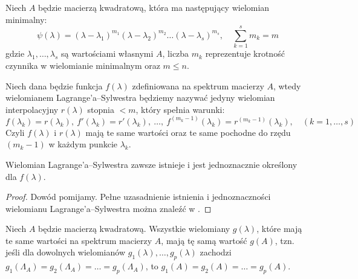 \begin{definition}
    Niech $A$ będzie macierzą kwadratową, która ma następujący wielomian minimalny:
    $$ \psi(\lambda) = (\lambda - \lambda_1)^{m_1}(\lambda - \lambda_2)^{m_2}\ldots(\lambda - \lambda_s)^{m_s}, \quad \sum_{k=1}^{s}{m_k} = m$$
    gdzie $\lambda_1, \ldots, \lambda_s$ są wartościami własnymi $A$, liczba $m_k$ reprezentuje krotność czynnika w wielomianie minimalnym oraz $m \le n$.

    Niech dana będzie funkcja $f(\lambda)$ zdefiniowana na spektrum macierzy $A$, wtedy wielomianem Lagrange'a--Sylwestra będziemy nazywać jedyny wielomian interpolacyjny $r(\lambda)$ stopnia $< m$, który spełnia warunki:
    $$ f(\lambda_k) = r(\lambda_k), \ f'(\lambda_k) = r'(\lambda_k), \ \ldots, \ f^{(m_k - 1)}(\lambda_k) = r^{(m_k - 1)}(\lambda_k), \quad (k = 1, \ldots, s) $$
    Czyli $f(\lambda)$ i $r(\lambda)$ mają te same wartości oraz te same pochodne do rzędu $(m_k - 1)$ w każdym punkcie $\lambda_k$.
\end{definition}
\begin{theorem}\label{theorem:exist_L_S_poly}
Wielomian Lagrange'a--Sylwestra zawsze istnieje i jest jednoznacznie określony dla $f(\lambda)$.
\end{theorem}
\begin{proof}
Dowód pomijamy. Pełne uzasadnienie istnienia i jednoznaczności wielomianu Lagrange'a--Sylwestra można znaleźć w \cite[Rozdział V, \S 2, str. 103]{gantmacher2000}.
\end{proof}
\begin{theorem}
    Niech $A$ będzie macierzą kwadratową. Wszystkie wielomiany $g(\lambda)$, które mają te same wartości na spektrum macierzy $A$, mają tę samą wartość $g(A)$, tzn. jeśli dla dowolnych wielomianów $g_1(\lambda), \ldots, g_p(\lambda)$ zachodzi $g_1(\Lambda_{A}) = g_2(\Lambda_{A}) = \ldots = g_p(\Lambda_{A})$, to $g_1(A) = g_2(A) = \ldots = g_p(A)$.
\end{theorem}
